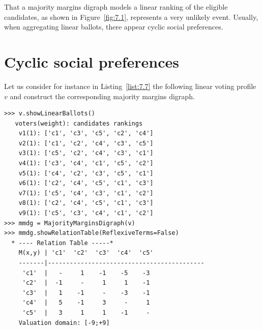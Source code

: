 That a majority margins digraph models a linear ranking of the eligible candidates, as shown in Figure~\vref{fig:7.1}, represents a very unlikely event. Usually, when aggregating linear ballots, there appear cyclic social preferences.

\section{Cyclic social preferences}
\label{sec:7.4}

Let us consider for instance in Listing~\vref{list:7.7} the following linear voting profile $v$ and construct the corresponding majority margins digraph.
\begin{lstlisting}[caption={Example of cyclic social preferences},label=list:7.7]
>>> v.showLinearBallots()
   voters(weight): candidates rankings
    v1(1): ['c1', 'c3', 'c5', 'c2', 'c4']
    v2(1): ['c1', 'c2', 'c4', 'c3', 'c5']
    v3(1): ['c5', 'c2', 'c4', 'c3', 'c1']
    v4(1): ['c3', 'c4', 'c1', 'c5', 'c2']
    v5(1): ['c4', 'c2', 'c3', 'c5', 'c1']
    v6(1): ['c2', 'c4', 'c5', 'c1', 'c3']
    v7(1): ['c5', 'c4', 'c3', 'c1', 'c2']
    v8(1): ['c2', 'c4', 'c5', 'c1', 'c3']
    v9(1): ['c5', 'c3', 'c4', 'c1', 'c2']
>>> mmdg = MajorityMarginsDigraph(v)
>>> mmdg.showRelationTable(ReflexiveTerms=False)
  * ---- Relation Table -----*
    M(x,y) | 'c1'  'c2'  'c3'  'c4'  'c5'	  
    -------|-------------------------------------------
     'c1'  |   -     1    -1    -5    -3	 
     'c2'  |  -1     - 	   1     1    -1	 
     'c3'  |   1    -1 	   -    -3    -1	 
     'c4'  |   5    -1     3     -     1	 
     'c5'  |   3     1 	   1    -1     - 	 
    Valuation domain: [-9;+9]
\end{lstlisting}    

